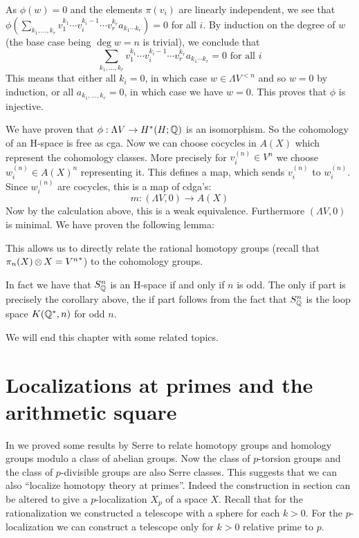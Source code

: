 As $\phi(w) = 0$ and the elements $\pi(v_i)$ are linearly independent, we see that $\phi(\sum_{k_1, \ldots, k_r} v_1^{k_1} \cdots v_i^{k_i - 1} \cdots v_r^{k_r}a_{k_1 \cdots k_r}) = 0$ for all $i$. By induction on the degree of $w$ (the base case being $\deg{w} = n$ is trivial), we conclude that
\[ \sum_{k_1, \ldots, k_r} v_1^{k_1} \cdots v_i^{k_i - 1} \cdots v_r^{k_r}a_{k_1 \cdots k_r} = 0 \text{ for all } i\]
This means that either all $k_i = 0$, in which case $w \in \Lambda V^{<n}$ and so $w = 0$ by induction, or all $a_{k_1, \ldots, k_r} = 0$, in which case we have $w = 0$. This proves that $\phi$ is injective.

We have proven that $\phi : \Lambda V \to H^\ast(H; \mathbb{Q})$ is an isomorphism. So the cohomology of an H-space is free as cga. Now we can choose cocycles in $A(X)$ which represent the cohomology classes. More precisely for $v_i^{(n)} \in V^n$ we choose $w_i^{(n)} \in A(X)^n$ representing it. This defines a map, which sends $v_i^{(n)}$ to $w_i^{(n)}$. Since $w_i^{(n)}$ are cocycles, this is a map of cdga's:
\[ m : (\Lambda V, 0) \to A(X) \]
Now by the calculation above, this is a weak equivalence. Furthermore $(\Lambda V, 0)$ is minimal. We have proven the following lemma:


This allows us to directly relate the rational homotopy groups (recall that $\pi_n(X) \operatorname*{\otimes} X = {V^n}^\ast$) to the cohomology groups.


In fact we have that $S^n_{\mathbb{Q}}$ is an H-space if and only if $n$ is odd. The only if part is precisely the corollary above, the if part follows from the fact that $S^n_{\mathbb{Q}}$ is the loop space $K(\mathbb{Q}^\ast, n)$ for odd $n$.

We will end this chapter with some related topics.

\section{Localizations at primes and the arithmetic square}
In  we proved some results by Serre to relate homotopy groups and homology groups modulo a class of abelian groups. Now the class of $p$-torsion groups and the class of $p$-divisible groups are also Serre classes. This suggests that we can also ``localize homotopy theory at primes''. Indeed the construction in section  can be altered to give a $p$-localization $X_p$ of a space $X$. Recall that for the rationalization we constructed a telescope with a sphere for each $k > 0$. For the $p$-localization we can construct a telescope only for $k > 0$ relative prime to $p$.

